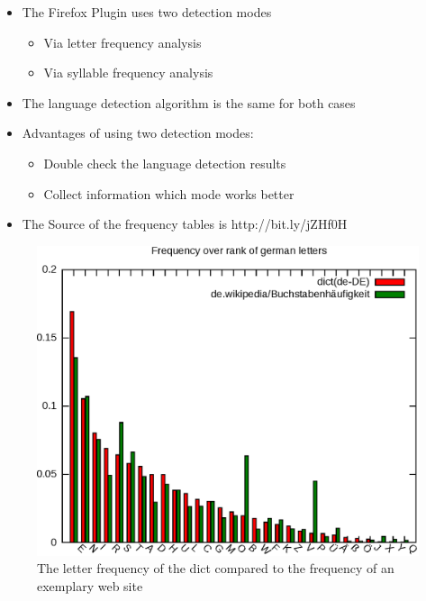 \begin{frame}[c]
\begin{itemize}
  \item The Firefox Plugin uses two detection modes
  \begin{itemize}
    \item Via letter frequency analysis
    \item Via syllable frequency analysis
  \end{itemize}
  \item The language detection algorithm is the same for both cases
  \item Advantages of using two detection modes:
  \begin{itemize}
    \item Double check the language detection results
    \item Collect information which mode works better
  \end{itemize}
  \item The Source of the frequency tables is http://bit.ly/jZHf0H
\end{itemize}
\end{frame}

\begin{frame}[c]
\begin{figure}[htp]
\begin{center}
  \includegraphics[width=1\textheight]{graphics/letters_de}
  \caption[fig:letters_de]{The letter frequency of the dict compared to the
  frequency of an exemplary web site}
  \label{fig:letterfreq}
\end{center}
\end{figure}
\end{frame}

